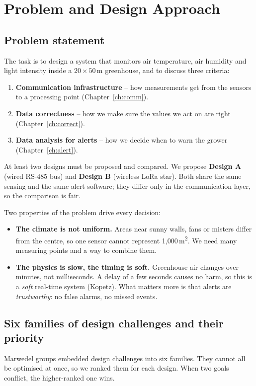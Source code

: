 \documentclass[11pt,a4paper]{report}
\begin{document}
\tableofcontents

\chapter{Problem and Design Approach}\label{ch:intro}

\section{Problem statement}
The task is to design a system that monitors air temperature, air humidity and light intensity inside a $20\times50$\,m greenhouse, and to discuss three criteria:
\begin{enumerate}[noitemsep]
  \item \textbf{Communication infrastructure} -- how measurements get from the sensors to a processing point (Chapter~\ref{ch:comm}).
  \item \textbf{Data correctness} -- how we make sure the values we act on are right (Chapter~\ref{ch:correct}).
  \item \textbf{Data analysis for alerts} -- how we decide when to warn the grower (Chapter~\ref{ch:alert}).
\end{enumerate}
At least two designs must be proposed and compared. We propose \textbf{Design A} (wired RS-485 bus) and \textbf{Design B} (wireless LoRa star). Both share the same sensing and the same alert software; they differ only in the communication layer, so the comparison is fair.

Two properties of the problem drive every decision:
\begin{itemize}
  \item \textbf{The climate is not uniform.} Areas near sunny walls, fans or misters differ from the centre, so one sensor cannot represent 1{,}000\,m\textsuperscript{2}. We need many measuring points and a way to combine them.
  \item \textbf{The physics is slow, the timing is soft.} Greenhouse air changes over minutes, not milliseconds. A delay of a few seconds causes no harm, so this is a \emph{soft} real-time system (Kopetz). What matters more is that alerts are \emph{trustworthy}: no false alarms, no missed events.
\end{itemize}

\section{Six families of design challenges and their priority}\label{sec:six}
Marwedel groups embedded design challenges into six families. They cannot all be optimised at once, so we ranked them for each design. When two goals conflict, the higher-ranked one wins.
\end{document}
